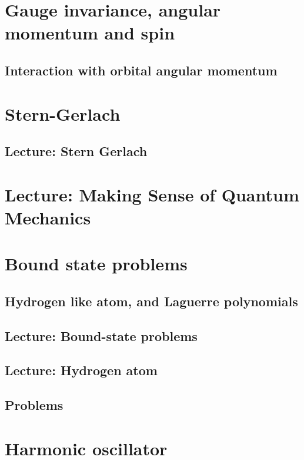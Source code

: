    \chapter{Gauge invariance, angular momentum and spin}
      \section{Interaction with orbital angular momentum}
         

   \chapter{Stern-Gerlach}
      \section{Lecture: Stern Gerlach}
         

   \chapter{Lecture: Making Sense of Quantum Mechanics}
      

   \chapter{Bound state problems}
      \section{Hydrogen like atom, and Laguerre polynomials}
         
      \section{Lecture: Bound-state problems}
         
      \section{Lecture: Hydrogen atom}
         
      \section{Problems}
         
         

   \chapter{Harmonic oscillator}
